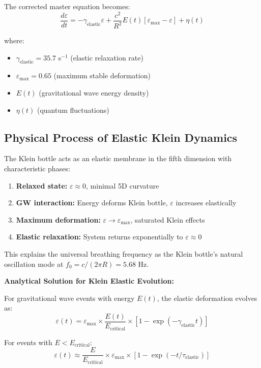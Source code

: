 \documentclass[12pt]{iopart}
\begin{document}
The corrected master equation becomes:
\begin{equation}
\frac{d\varepsilon}{dt} = -\gamma_{\text{elastic}}\varepsilon + \frac{c^2}{R^2}E(t)[\varepsilon_{\max} - \varepsilon] + \eta(t)
\label{eq:elastic_master}
\end{equation}

where:
\begin{itemize}
\item $\gamma_{\text{elastic}} = 35.7$ s$^{-1}$ (elastic relaxation rate)
\item $\varepsilon_{\max} = 0.65$ (maximum stable deformation)
\item $E(t)$ (gravitational wave energy density)
\item $\eta(t)$ (quantum fluctuations)
\end{itemize}

\subsection{Physical Process of Elastic Klein Dynamics}

The Klein bottle acts as an elastic membrane in the fifth dimension with characteristic phases:
\begin{enumerate}
\item \textbf{Relaxed state:} $\varepsilon \approx 0$, minimal 5D curvature
\item \textbf{GW interaction:} Energy deforms Klein bottle, $\varepsilon$ increases elastically  
\item \textbf{Maximum deformation:} $\varepsilon \to \varepsilon_{\max}$, saturated Klein effects
\item \textbf{Elastic relaxation:} System returns exponentially to $\varepsilon \approx 0$
\end{enumerate}

This explains the universal breathing frequency as the Klein bottle's natural oscillation mode at $f_0 = c/(2\pi R) = 5.68$ Hz.

\textbf{Analytical Solution for Klein Elastic Evolution:}

For gravitational wave events with energy $E(t)$, the elastic deformation evolves as:
\begin{equation}
\varepsilon(t) = \varepsilon_{\max} \times \frac{E(t)}{E_{\text{critical}}} \times [1 - \exp(-\gamma_{\text{elastic}} t)]
\end{equation}

For events with $E < E_{\text{critical}}$:
\begin{equation}
\varepsilon(t) \approx \frac{E}{E_{\text{critical}}} \times \varepsilon_{\max} \times [1 - \exp(-t/\tau_{\text{elastic}})]
\end{equation}
\end{document}
